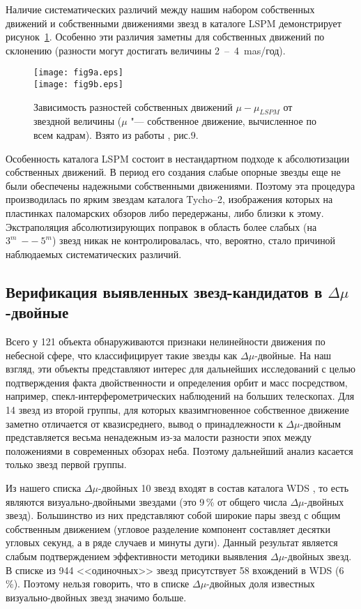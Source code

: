 Наличие систематических различий между нашим набором собственных движений и собственными движениями звезд в каталоге LSPM демонстрирует рисунок~\ref{fig:15dmu}. Особенно эти различия заметны для собственных движений по склонению (разности могут достигать величины 2~--~4~mas/год).
\begin{figure}[h]
\centering
\texttt{[image: fig9a.eps]}\\
\texttt{[image: fig9b.eps]}
\caption{Зависимость разностей собственных движений $\mu - \mu_{LSPM}$ от звездной величины ($\mu$ "--- собственное движение, вычисленное по всем кадрам). Взято из работы \cite{2015AstL...41..833K}, рис.9.}
\label{fig:15dmu}
\end{figure}
Особенность каталога LSPM состоит в нестандартном подходе к абсолютизации собственных движений. В период его создания слабые опорные звезды еще не были обеспечены надежными собственными движениями. Поэтому эта процедура производилась по ярким звездам каталога Tycho--2, изображения которых на пластинках паломарских обзоров либо передержаны, либо близки к этому. Экстраполяция абсолютизирующих поправок в область более слабых (на $3^m~--~5^m$) звезд никак не контролировалась, что, вероятно, стало причиной наблюдаемых систематических различий.
\subsection{Верификация выявленных звезд-кандидатов в $\Delta\mu$-двойные} \label{subsec:ch3/sect3/sub3}
Всего у 121 объекта обнаруживаются признаки нелинейности движения по небесной сфере, что классифицирует такие звезды как $\Delta\mu$-двойные. На наш взгляд, эти объекты представляют интерес для дальнейших исследований с целью подтверждения факта двойственности и определения орбит и масс посредством, например,  спекл-интерферометрических наблюдений на больших телескопах. Для 14 звезд из второй группы, для которых квазимгновенное собственное движение заметно отличается от квазисреднего, вывод о принадлежности к $\Delta\mu$-двойным представляется весьма ненадежным из-за малости разности эпох между положениями в современных обзорах неба. Поэтому дальнейший анализ касается только звезд первой группы.

Из нашего списка $\Delta\mu$-двойных 10 звезд входят в состав каталога WDS \cite{2001AJ....122.3466M}, то есть являются визуально-двойными звездами (это 9\,\% от общего числа $\Delta\mu$-двойных звезд). Большинство из них представляют собой широкие пары звезд с общим собственным движением (угловое разделение компонент составляет десятки угловых секунд, а в ряде случаев и минуты дуги). Данный результат является слабым подтверждением эффективности методики выявления $\Delta\mu$-двойных звезд. В списке из 944 <<одиночных>> звезд присутствует 58 вхождений в WDS (6\,\%). Поэтому нельзя говорить, что в списке  $\Delta\mu$-двойных доля известных визуально-двойных звезд значимо больше.

